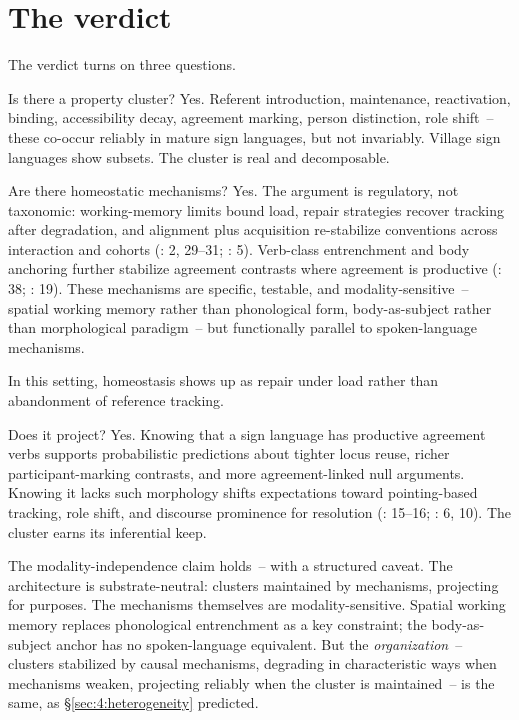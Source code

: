 \section{The verdict}
\label{sec:sign:verdict}

The verdict turns on three questions.

Is there a property cluster? Yes. Referent introduction, maintenance, reactivation, binding, accessibility decay, agreement marking, person distinction, role shift~-- these co-occur reliably in mature sign languages, but not invariably. Village sign languages show subsets. The cluster is real and decomposable.

Are there homeostatic mechanisms? Yes. The argument is regulatory, not taxonomic: working-memory limits bound load, repair strategies recover tracking after degradation, and alignment plus acquisition re-stabilize conventions across interaction and cohorts (\citealt{steinbach2016}: 2, 29--31; \citealt{senghas2001}: 5). Verb-class entrenchment and body anchoring further stabilize agreement contrasts where agreement is productive (\citealt{sandler2006}: 38; \citealt{padden2010}: 19). These mechanisms are specific, testable, and modality-sensitive~-- spatial working memory rather than phonological form, body-as-subject rather than morphological paradigm~-- but functionally parallel to spoken-language mechanisms.

In this setting, homeostasis shows up as repair under load rather than abandonment of reference tracking.

Does it project? Yes. Knowing that a sign language has productive agreement verbs supports probabilistic predictions about tighter locus reuse, richer participant-marking contrasts, and more agreement-linked null arguments. Knowing it lacks such morphology shifts expectations toward pointing-based tracking, role shift, and discourse prominence for resolution (\citealt{sandler2006}: 15--16; \citealt{steinbach2016}: 6, 10). The cluster earns its inferential keep.

The modality-independence claim holds~-- with a structured caveat. The architecture is substrate-neutral: clusters maintained by mechanisms, projecting for purposes. The mechanisms themselves are modality-sensitive. Spatial working memory replaces phonological entrenchment as a key constraint; the body-as-subject anchor has no spoken-language equivalent. But the \textit{organization}~-- clusters stabilized by causal mechanisms, degrading in characteristic ways when mechanisms weaken, projecting reliably when the cluster is maintained~-- is the same, as §\ref{sec:4:heterogeneity} predicted.

